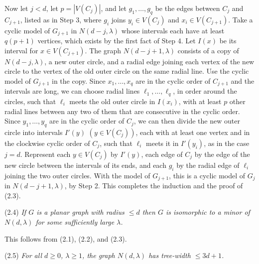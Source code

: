{Now let $j < d$, let $p = |V(C_j)|$, and let $g_1, \dots, g_q$ be the edges between $C_j$ and $C_{j+1}$, listed as in Step 3, where $g_i$ joins $y_i \in V(C_j)$ and $x_i \in V(C_{j+1})$. Take a cyclic model of $G_{j+1}$ in $N(d - j, \lambda)$ whose intervals each have at least $q(p + 1)$ vertices, which exists by the first fact of Step 4. Let $I(x)$ be its interval for $x \in V(C_{j+1})$. The graph $N(d - j + 1, \lambda)$ consists of a copy of $N(d - j, \lambda)$, a new outer circle, and a radial edge joining each vertex of the new circle to the vertex of the old outer circle on the same radial line. Use the cyclic model of $G_{j+1}$ in the copy. Since $x_1, \dots, x_q$ are in the cyclic order of $C_{j+1}$ and the intervals are long, we can choose radial lines $\ell_1, \dots, \ell_q$, in order around the circles, such that $\ell_i$ meets the old outer circle in $I(x_i)$, with at least $p$ other radial lines between any two of them that are consecutive in the cyclic order. Since $y_1, \dots, y_q$ are in the cyclic order of $C_j$, we can then divide the new outer circle into intervals $I'(y)$ $(y \in V(C_j))$, each with at least one vertex and in the clockwise cyclic order of $C_j$, such that $\ell_i$ meets it in $I'(y_i)$, as in the case $j = d$. Represent each $y \in V(C_j)$ by $I'(y)$, each edge of $C_j$ by the edge of the new circle between the intervals of its ends, and each $g_i$ by the radial edge of $\ell_i$ joining the two outer circles. With the model of $G_{j+1}$, this is a cyclic model of $G_j$ in $N(d - j + 1, \lambda)$, by Step 2. This completes the induction and the proof of (2.3).}

\stmt
(2.4) \textit{If $G$ is a planar graph with radius $\le d$ then $G$ is isomorphic to a minor of $N(d, \lambda)$ for some sufficiently large $\lambda$.}

This follows from (2.1), (2.2), and (2.3).

\stmt
(2.5) \textit{For all $d \ge 0$, $\lambda \ge 1$, the graph $N(d, \lambda)$ has tree-width $\le 3d + 1$.}

